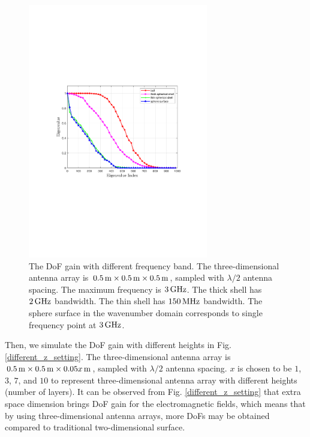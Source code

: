 \documentclass[12pt,draftclsnofoot,journal,onecolumn]{IEEEtran}
\begin{document}
	
	\begin{figure}
		\centering 
		\includegraphics[width=0.7\textwidth]{figs/different_frequency_setting.pdf} 
		\caption{The DoF gain with different frequency band. The three-dimensional antenna array is $0.5\,{\rm m} \times 0.5\,{\rm m} \times 0.5\,{\rm m}$, sampled with $\lambda/2$ antenna spacing. The maximum frequency is $3\,{\rm GHz}$. The thick shell has $2\,{\rm GHz}$ bandwidth. The thin shell has $150\,{\rm MHz}$ bandwidth. The sphere surface in the wavenumber domain corresponds to single frequency point at $3\,{\rm GHz}$.} 
		\label{different_frequency_setting}
	\end{figure}
	
	
	Then, we simulate the DoF gain with different heights in Fig. \ref{different_z_setting}. The three-dimensional antenna array is $0.5\,{\rm m} \times 0.5\,{\rm m} \times 0.05x\,{\rm m}$, sampled with $\lambda/2$ antenna spacing. $x$ is chosen to be $1$, $3$, $7$, and $10$ to represent three-dimensional antenna array with different heights (number of layers). It can be observed from Fig. \ref{different_z_setting} that extra space dimension brings DoF gain for the  electromagnetic fields, which means that by using three-dimensional antenna arrays, more DoFs may be obtained compared to traditional two-dimensional surface. 
	
\end{document}
